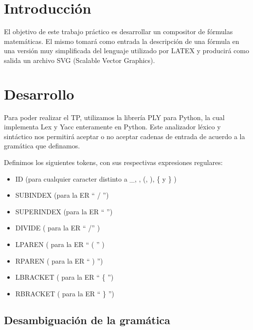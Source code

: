 \documentclass[a4paper, 10pt, twoside]{article}
\begin{document}
\newpage

\tableofcontents

\newpage


\section{Introducción}
El objetivo de este trabajo práctico es desarrollar un compositor de fórmulas matemáticas. El mismo tomará como entrada la descripción de una fórmula en una versión muy simplificada del lenguaje utilizado por LATEX y producirá como salida un archivo SVG (Scalable Vector Graphics).

\section{Desarrollo}
Para poder realizar el TP, utilizamos la librería PLY para Python, la cual implementa Lex y Yacc enteramente en Python. Este analizador léxico y sintáctico nos permitirá aceptar o no aceptar cadenas de entrada de acuerdo a la gramática que definamos.

Definimos los siguientes tokens, con sus respectivas expresiones regulares:
\begin{itemize}
  \item ID (para cualquier caracter distinto a \_, \detokenize{^}, (, ), \{ y \} )
  \item SUBINDEX (para la ER `` / '')
  \item SUPERINDEX (para la ER `` \detokenize{^} '')
  \item DIVIDE ( para la ER `` /'' )
  \item LPAREN ( para la ER `` ( '' )
  \item RPAREN ( para la ER `` ) '')
  \item LBRACKET ( para la ER `` \{ '')
  \item RBRACKET ( para la ER `` \} '')
\end{itemize}

\subsection{Desambiguación de la gramática}
\end{document}
